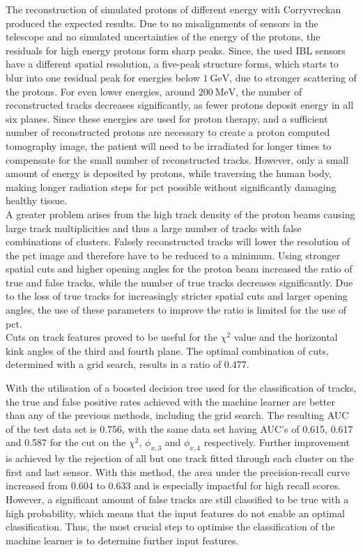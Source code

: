 The reconstruction of simulated protons of different energy with Corryvreckan produced the expected results. Due to no misalignments of sensors in the telescope and no simulated uncertainties
of the energy of the protons, the residuals for high energy protons form sharp peaks. Since, the used IBL sensors have a different spatial resolution, a five-peak structure
forms, which starts to blur into one residual peak for energies below $\SI{1}{\giga\eV}$, due to stronger scattering of the protons. For even lower energies,
around $\SI{200}{\mega\eV}$, the number of reconstructed tracks decreases significantly, as fewer protons deposit energy in all six planes. Since these energies are
used for proton therapy, and a sufficient number of reconstructed protons are necessary to create a proton computed tomography image, the patient
will need to be irradiated for longer times to compensate for the small number of reconstructed tracks. However, only a small amount of energy is deposited by protons, while traversing
the human body, making longer radiation steps for pct possible without significantly damaging healthy tissue. \\
A greater problem arises from the high track density of the proton beams causing large track multiplicities and thus a large number of tracks with false combinations of
clusters. Falsely reconstructed tracks will lower the resolution of the pct image and therefore have to be reduced to a minimum. Using stronger spatial cuts and higher
opening angles for the proton beam increased the ratio of true and false tracks, while the number of true tracks decreases significantly. Due to the loss of
true tracks for increasingly stricter spatial cuts and larger opening angles, the use of these parameters to improve the ratio is limited for the use of pct. \\
Cuts on track features proved to be useful for the $\chi^2$ value and the horizontal kink angles of the third and fourth plane. The optimal combination of cuts, determined
with a grid search, results in a ratio of 0.477.

With the utilisation of a boosted decision tree used for the classification of tracks, the true and false positive rates achieved with the machine learner are better
than any of the previous methods, including the grid search. The resulting AUC of the test data set is 0.756, with the same data set having AUC's of
0.615, 0.617 and 0.587 for the cut on the $\chi^2$, $\phi_{x,3}$ and $\phi_{x,4}$ respectively. Further improvement is achieved by the rejection of all but one track
fitted through each cluster on the first and last sensor. With this method, the area under the precision-recall curve increased from $0.604$ to $0.633$ and is especially
impactful for high recall scores. \\
However, a significant amount of false tracks are still classified to be true
with a high probability, which means that the input features do not enable an optimal classification.
Thus, the most crucial step to optimise the classification of the machine learner is to determine further input features.


